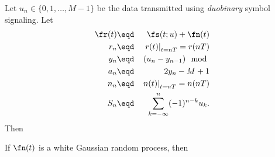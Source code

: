 \begin{theorem}
Let $u_n\in\{0,1,\ldots,M-1\}$ be the data transmitted
using {\em duobinary} symbol signaling.
Let
\begin{eqnarray*}
   \fr(t)&\eqd& \fs(t;u) + \fn(t)               \\
   r_n &\eqd& \left. r(t)\right|_{t=nT} = r(nT) \\
   y_n &\eqd& (u_n - y_{n-1})\mod               \\
   a_n &\eqd& 2y_n -M + 1                       \\
   n_n &\eqd& \left. n(t)\right|_{t=nT} = n(nT) \\
   S_n   &\eqd& \sum_{k=-\infty}^n (-1)^{n-k} u_k.
\end{eqnarray*}
Then

If $\fn(t)$ is a white Gaussian random process, then
\end{theorem}
